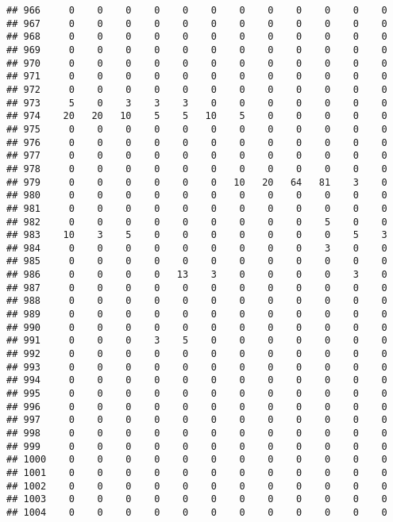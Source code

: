 \documentclass[]{article}
\begin{document}
\begin{verbatim}
## 966     0    0    0    0    0    0    0    0    0    0    0    0
## 967     0    0    0    0    0    0    0    0    0    0    0    0
## 968     0    0    0    0    0    0    0    0    0    0    0    0
## 969     0    0    0    0    0    0    0    0    0    0    0    0
## 970     0    0    0    0    0    0    0    0    0    0    0    0
## 971     0    0    0    0    0    0    0    0    0    0    0    0
## 972     0    0    0    0    0    0    0    0    0    0    0    0
## 973     5    0    3    3    3    0    0    0    0    0    0    0
## 974    20   20   10    5    5   10    5    0    0    0    0    0
## 975     0    0    0    0    0    0    0    0    0    0    0    0
## 976     0    0    0    0    0    0    0    0    0    0    0    0
## 977     0    0    0    0    0    0    0    0    0    0    0    0
## 978     0    0    0    0    0    0    0    0    0    0    0    0
## 979     0    0    0    0    0    0   10   20   64   81    3    0
## 980     0    0    0    0    0    0    0    0    0    0    0    0
## 981     0    0    0    0    0    0    0    0    0    0    0    0
## 982     0    0    0    0    0    0    0    0    0    5    0    0
## 983    10    3    5    0    0    0    0    0    0    0    5    3
## 984     0    0    0    0    0    0    0    0    0    3    0    0
## 985     0    0    0    0    0    0    0    0    0    0    0    0
## 986     0    0    0    0   13    3    0    0    0    0    3    0
## 987     0    0    0    0    0    0    0    0    0    0    0    0
## 988     0    0    0    0    0    0    0    0    0    0    0    0
## 989     0    0    0    0    0    0    0    0    0    0    0    0
## 990     0    0    0    0    0    0    0    0    0    0    0    0
## 991     0    0    0    3    5    0    0    0    0    0    0    0
## 992     0    0    0    0    0    0    0    0    0    0    0    0
## 993     0    0    0    0    0    0    0    0    0    0    0    0
## 994     0    0    0    0    0    0    0    0    0    0    0    0
## 995     0    0    0    0    0    0    0    0    0    0    0    0
## 996     0    0    0    0    0    0    0    0    0    0    0    0
## 997     0    0    0    0    0    0    0    0    0    0    0    0
## 998     0    0    0    0    0    0    0    0    0    0    0    0
## 999     0    0    0    0    0    0    0    0    0    0    0    0
## 1000    0    0    0    0    0    0    0    0    0    0    0    0
## 1001    0    0    0    0    0    0    0    0    0    0    0    0
## 1002    0    0    0    0    0    0    0    0    0    0    0    0
## 1003    0    0    0    0    0    0    0    0    0    0    0    0
## 1004    0    0    0    0    0    0    0    0    0    0    0    0

\end{verbatim}
\end{document}
